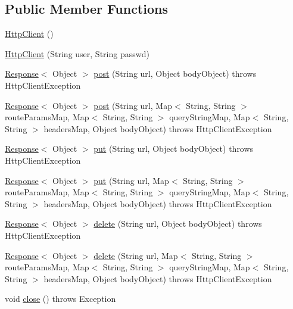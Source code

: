 \subsection*{Public Member Functions}
\begin{DoxyCompactItemize}
\item 
\hyperlink{classedu_1_1sjsu_1_1amigo_1_1http_1_1client_1_1_http_client_a31a5f027d0d0e24715652481b4de3b5c}{Http\+Client} ()
\item 
\hyperlink{classedu_1_1sjsu_1_1amigo_1_1http_1_1client_1_1_http_client_ad32a0b638fbea3fb6c96f9b95a4f03f8}{Http\+Client} (String user, String passwd)
\item 
\hyperlink{classedu_1_1sjsu_1_1amigo_1_1http_1_1client_1_1_response}{Response}$<$ Object $>$ \hyperlink{classedu_1_1sjsu_1_1amigo_1_1http_1_1client_1_1_http_client_a0bfbdc02d793db5d3a85c9067533d47d}{post} (String url, Object body\+Object)  throws Http\+Client\+Exception 
\item 
\hyperlink{classedu_1_1sjsu_1_1amigo_1_1http_1_1client_1_1_response}{Response}$<$ Object $>$ \hyperlink{classedu_1_1sjsu_1_1amigo_1_1http_1_1client_1_1_http_client_a142b3fd468c2408083dade16b705dcd1}{post} (String url, Map$<$ String, String $>$ route\+Params\+Map, Map$<$ String, String $>$ query\+String\+Map, Map$<$ String, String $>$ headers\+Map, Object body\+Object)  throws Http\+Client\+Exception 
\item 
\hyperlink{classedu_1_1sjsu_1_1amigo_1_1http_1_1client_1_1_response}{Response}$<$ Object $>$ \hyperlink{classedu_1_1sjsu_1_1amigo_1_1http_1_1client_1_1_http_client_ac15f254786205f4289d1092be7be60b0}{put} (String url, Object body\+Object)  throws Http\+Client\+Exception 
\item 
\hyperlink{classedu_1_1sjsu_1_1amigo_1_1http_1_1client_1_1_response}{Response}$<$ Object $>$ \hyperlink{classedu_1_1sjsu_1_1amigo_1_1http_1_1client_1_1_http_client_a8978182148f2fdc3a391a3b674741973}{put} (String url, Map$<$ String, String $>$ route\+Params\+Map, Map$<$ String, String $>$ query\+String\+Map, Map$<$ String, String $>$ headers\+Map, Object body\+Object)  throws Http\+Client\+Exception 
\item 
\hyperlink{classedu_1_1sjsu_1_1amigo_1_1http_1_1client_1_1_response}{Response}$<$ Object $>$ \hyperlink{classedu_1_1sjsu_1_1amigo_1_1http_1_1client_1_1_http_client_abe7f89358f3414a949b1bc5390c34f06}{delete} (String url, Object body\+Object)  throws Http\+Client\+Exception 
\item 
\hyperlink{classedu_1_1sjsu_1_1amigo_1_1http_1_1client_1_1_response}{Response}$<$ Object $>$ \hyperlink{classedu_1_1sjsu_1_1amigo_1_1http_1_1client_1_1_http_client_a85083a4f63526cfbc0b4004b0ef4082e}{delete} (String url, Map$<$ String, String $>$ route\+Params\+Map, Map$<$ String, String $>$ query\+String\+Map, Map$<$ String, String $>$ headers\+Map, Object body\+Object)  throws Http\+Client\+Exception 
\item 
void \hyperlink{classedu_1_1sjsu_1_1amigo_1_1http_1_1client_1_1_http_client_a5807fb0dab40c227bb34ffc14e708294}{close} ()  throws Exception 
\end{DoxyCompactItemize}
